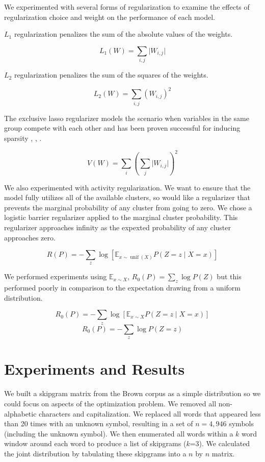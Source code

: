 \documentclass[11pt,letterpaper]{article}
\begin{document}
We experimented with several forms of regularization to examine the effects of regularization choice and weight on the performance of each model.

$L_1$ regularization penalizes the sum of the absolute values of the weights.

$$L_1(W) = \sum_{i,j} \lvert W_{i,j} \rvert $$

$L_2$ regularization penalizes the sum of the squares of the weights.

$$L_2(W) = \sum_{i,j} (W_{i,j})^2 $$

The exclusive lasso regularizer models the scenario when variables in the same group compete with each other and has been proven successful for inducing sparsity
\cite{zhou10a}, 
\cite{bach2012},
 \cite{Campbell15}.

$$V(W) = \sum_i (\sum_j \lvert W_{i,j} \rvert)^2$$ 

We also experimented with activity regularization. We want to ensure that the model fully utilizes all of the available clusters, so would like a regularizer that prevents the marginal probability of any cluster from going to zero. We chose a logistic barrier regularizer applied to the marginal cluster probability. This regularizer approaches infinity as the expexted probability of any cluster approaches zero.

$$ R(P) = -\sum_z \log[ \mathbb{E}_{x \sim \operatorname{unif}(X)} P(Z=z \mid X=x)]$$ 

We performed experiments using $\mathbb{E}_{x \sim X}$, $R_0(P)=\sum_z \log P(Z)$ but this performed poorly in comparison to the expectation drawing from a uniform distribution.

$$R_0(P) =  -\sum_z \log [ \mathbb{E}_{x \sim X} P(Z=z \mid X=x) ]$$ 
$$R_0(P) =  -\sum_z \log P(Z=z )$$ 

\section{Experiments and Results}

We built a skipgram matrix from the Brown corpus as a simple distribution so we could focus on aspects of the optimization problem. We removed all non-alphabetic characters and capitalization. We replaced all words that appeared less than 20 times with an unknown symbol, resulting in a set of $n=4,946$ symbols (including the unknown symbol). We then enumerated all words within a $k$ word window around each word to produce a list of skipgrams ($k$=3). We calculated the joint distribution by tabulating these skipgrams into a $n$ by $n$ matrix.
\end{document}

